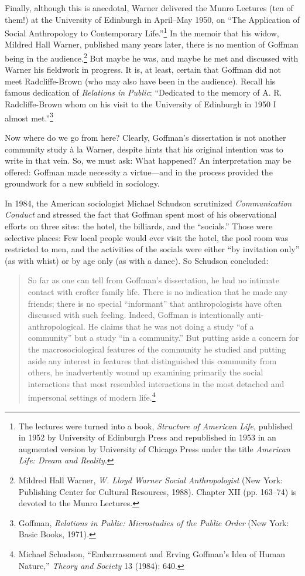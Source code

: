 \documentclass[twoside,symmetric,nobib,justified]{tufte-book}
\begin{document}
Finally, although this is anecdotal, Warner delivered the Munro Lectures
(ten of them!) at the University of Edinburgh in April--May 1950, on
``The Application of Social Anthropology to Contemporary
Life.''\footnote{The lectures were turned into a book, \emph{Structure
  of American Life}, published in 1952 by University of Edinburgh Press
  and republished in 1953 in an augmented version by University of
  Chicago Press under the title \emph{American Life: Dream and Reality}.}
In the memoir that his widow, Mildred Hall Warner, published many years
later, there is no mention of Goffman being in the audience.\footnote{Mildred
  Hall Warner, \emph{W. Lloyd Warner Social Anthropologist} (New York:
  Publishing Center for Cultural Resources, 1988). Chapter XII (pp.
  163--74) is devoted to the Munro Lectures.} But maybe he was, and
maybe he met and discussed with Warner his fieldwork in progress. It is,
at least, certain that Goffman did not meet Radcliffe-Brown (who may
also have been in the audience). Recall his famous dedication of
\emph{Relations in Public}: ``Dedicated to the memory of A. R.
Radcliffe-Brown whom on his visit to the University of Edinburgh in 1950
I almost met.''\footnote{Goffman, \emph{Relations in Public:
  Microstudies of the Public Order} (New York: Basic Books, 1971).}

Now where do we go from here? Clearly, Goffman's dissertation is not
another community study à la Warner, despite hints that his original
intention was to write in that vein. So, we must ask: What happened? An
interpretation may be offered: Goffman made necessity a virtue---and in
the process provided the groundwork for a new subfield in sociology.

In 1984, the American sociologist Michael Schudson scrutinized
\emph{Communication Conduct} and stressed the fact that Goffman spent
most of his observational efforts on three sites: the hotel, the
billiards, and the ``socials.'' Those were selective places: Few local
people would ever visit the hotel, the pool room was restricted to men,
and the activities of the socials were either ``by invitation only'' (as
with whist) or by age only (as with a dance). So Schudson concluded:

\begin{quote}
So far as one can tell from Goffman's dissertation, he had no intimate
contact with crofter family life. There is no indication that he made
any friends; there is no special ``informant'' that anthropologists have
often discussed with such feeling. Indeed, Goffman is intentionally
anti-anthropological. He claims that he was not doing a study ``of a
community'' but a study ``in a community.'' But putting aside a concern
for the macrosociological features of the community he studied and
putting aside any interest in features that distinguished this community
from others, he inadvertently wound up examining primarily the social
interactions that most resembled interactions in the most detached and
impersonal settings of modern life.\footnote{Michael Schudson,
  ``Embarrassment and Erving Goffman's Idea of Human Nature,''
  \emph{Theory and Society} 13 (1984): 640.}
\end{quote}
\end{document}
